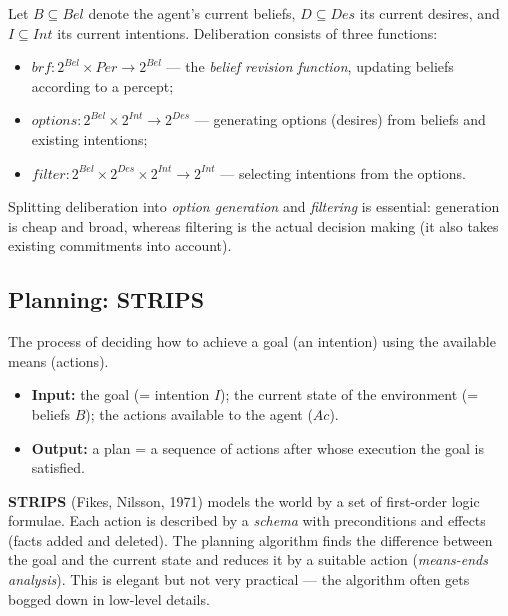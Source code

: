 \documentclass[11pt,a4paper]{article}
\theoremstyle{definition}
\begin{document}
\begin{defbox}
Let $B \subseteq \mathit{Bel}$ denote the agent's current beliefs, $D \subseteq \mathit{Des}$ its
current desires, and $I \subseteq \mathit{Int}$ its current intentions. Deliberation consists of
three functions:
\begin{itemize}
\item $\mathit{brf} : 2^{\mathit{Bel}} \times \mathit{Per} \to 2^{\mathit{Bel}}$ ---
  the \emph{belief revision function}, updating beliefs according to a percept;
\item $\mathit{options} : 2^{\mathit{Bel}} \times 2^{\mathit{Int}} \to 2^{\mathit{Des}}$ ---
  generating options (desires) from beliefs and existing intentions;
\item $\mathit{filter} : 2^{\mathit{Bel}} \times 2^{\mathit{Des}} \times 2^{\mathit{Int}}
  \to 2^{\mathit{Int}}$ --- selecting intentions from the options.
\end{itemize}
Splitting deliberation into \emph{option generation} and \emph{filtering} is essential: generation
is cheap and broad, whereas filtering is the actual decision making (it also takes existing
commitments into account).
\end{defbox}

\subsection{Planning: STRIPS}

\begin{defbox}
The process of deciding how to achieve a goal (an intention) using the available means (actions).
\begin{itemize}
\item \textbf{Input:} the goal (= intention $I$); the current state of the environment
  (= beliefs $B$); the actions available to the agent ($\mathit{Ac}$).
\item \textbf{Output:} a plan = a sequence of actions after whose execution the goal is satisfied.
\end{itemize}
\end{defbox}

\textbf{STRIPS} (Fikes, Nilsson, 1971) models the world by a set of first-order logic formulae.
Each action is described by a \emph{schema} with preconditions and effects (facts added and
deleted). The planning algorithm finds the difference between the goal and the current state and
reduces it by a suitable action (\emph{means-ends analysis}). This is elegant but not very
practical --- the algorithm often gets bogged down in low-level details.
\end{document}
